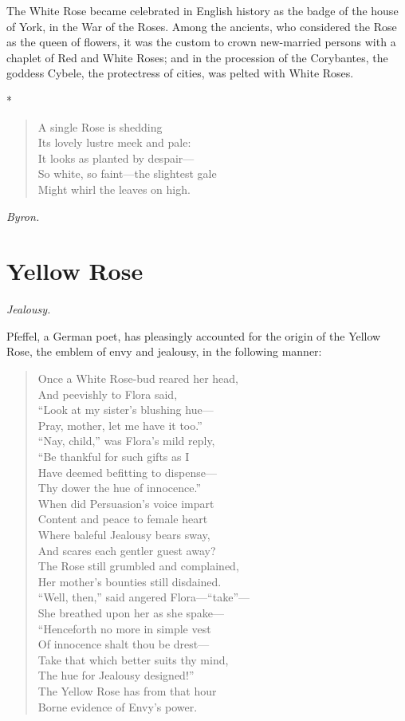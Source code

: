 \documentclass[11pt,twoside]{article}
\newcommand\flower[2]{\section*{#1}\addcontentsline{toc}{section}{#1}%
  \noindent\textit{#2.}\par\medskip}
\newcommand\stars{\begin{center}*\quad*\quad*\end{center}}
\newcommand\by[1]{\par\hfill\textit{#1}\par}
\begin{document}
The White Rose became celebrated in English history as the badge of the house of York, in the War of the Roses. Among the ancients, who considered the Rose as the queen of flowers, it was the custom to crown new-married persons with a chaplet of Red and White Roses; and in the procession of the Corybantes, the goddess Cybele, the protectress of cities, was pelted with White Roses.

\stars

\begin{verse}
A single Rose is shedding\\
Its lovely lustre meek and pale:\\
It looks as planted by despair---\\
So white, so faint---the slightest gale\\
Might whirl the leaves on high.
\end{verse}

\by{Byron.}

\flower{Yellow Rose}{Jealousy}

Pfeffel, a German poet, has pleasingly accounted for the origin of the Yellow Rose, the emblem of envy and jealousy, in the following manner:

\begin{verse}
Once a White Rose-bud reared her head,\\
And peevishly to Flora said,\\
“Look at my sister’s blushing hue---\\
Pray, mother, let me have it too.”\\
“Nay, child,” was Flora’s mild reply,\\
“Be thankful for such gifts as I\\
Have deemed befitting to dispense---\\
Thy dower the hue of innocence.”\\
When did Persuasion’s voice impart\\
Content and peace to female heart\\
Where baleful Jealousy bears sway,\\
And scares each gentler guest away?\\
The Rose still grumbled and complained,\\
Her mother’s bounties still disdained.\\
“Well, then,” said angered Flora---“take”---\\
She breathed upon her as she spake---\\
“Henceforth no more in simple vest\\
Of innocence shalt thou be drest---\\
Take that which better suits thy mind,\\
The hue for Jealousy designed!”\\
The Yellow Rose has from that hour\\
Borne evidence of Envy’s power.
\end{verse}
\end{document}
